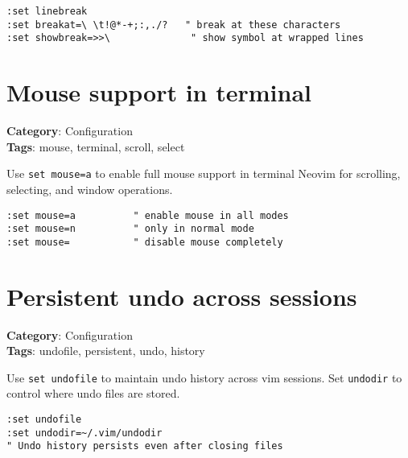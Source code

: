 \begin{Exa*}{}
\begin{Verbatim}[fontsize=\footnotesize, breaklines, breakanywhere]
:set linebreak
:set breakat=\ \t!@*-+;:,./?   " break at these characters
:set showbreak=>>\              " show symbol at wrapped lines
\end{Verbatim}
\end{Exa*}

\section{Mouse support in terminal}

\textbf{Category}: Configuration\\ \textbf{Tags}: mouse, terminal, scroll, select
\vspace{0.5cm}

Use {\footnotesize \Verb§set mouse=a§} to enable full mouse support in terminal Neovim for scrolling, selecting, and window operations.

\begin{Exa*}{}
\begin{Verbatim}[fontsize=\footnotesize, breaklines, breakanywhere]
:set mouse=a          " enable mouse in all modes
:set mouse=n          " only in normal mode
:set mouse=           " disable mouse completely
\end{Verbatim}
\end{Exa*}

\section{Persistent undo across sessions}

\textbf{Category}: Configuration\\ \textbf{Tags}: undofile, persistent, undo, history
\vspace{0.5cm}

Use {\footnotesize \Verb§set undofile§} to maintain undo history across vim sessions. Set {\footnotesize \Verb§undodir§} to control where undo files are stored.

\begin{Exa*}{}
\begin{Verbatim}[fontsize=\footnotesize, breaklines, breakanywhere]
:set undofile
:set undodir=~/.vim/undodir
" Undo history persists even after closing files
\end{Verbatim}
\end{Exa*}

